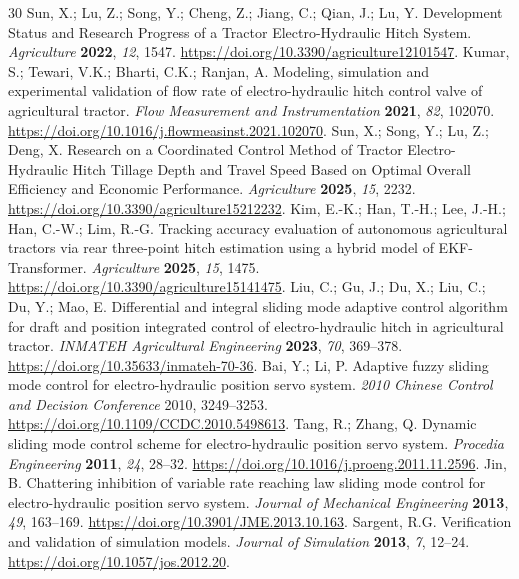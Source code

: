 \documentclass[machines,article,submit,pdftex,moreauthors]{Definitions/mdpi}
\begin{document}
\begin{thebibliography}{30}
 Sun, X.; Lu, Z.; Song, Y.; Cheng, Z.; Jiang, C.; Qian, J.; Lu, Y. Development Status and Research Progress of a Tractor Electro-Hydraulic Hitch System. \emph{Agriculture} \textbf{2022}, \emph{12}, 1547. \url{https://doi.org/10.3390/agriculture12101547}.
 Kumar, S.; Tewari, V.K.; Bharti, C.K.; Ranjan, A. Modeling, simulation and experimental validation of flow rate of electro-hydraulic hitch control valve of agricultural tractor. \emph{Flow Measurement and Instrumentation} \textbf{2021}, \emph{82}, 102070. \url{https://doi.org/10.1016/j.flowmeasinst.2021.102070}.
 Sun, X.; Song, Y.; Lu, Z.; Deng, X. Research on a Coordinated Control Method of Tractor Electro-Hydraulic Hitch Tillage Depth and Travel Speed Based on Optimal Overall Efficiency and Economic Performance. \emph{Agriculture} \textbf{2025}, \emph{15}, 2232. \url{https://doi.org/10.3390/agriculture15212232}.
 Kim, E.-K.; Han, T.-H.; Lee, J.-H.; Han, C.-W.; Lim, R.-G. Tracking accuracy evaluation of autonomous agricultural tractors via rear three-point hitch estimation using a hybrid model of EKF-Transformer. \emph{Agriculture} \textbf{2025}, \emph{15}, 1475. \url{https://doi.org/10.3390/agriculture15141475}.
 Liu, C.; Gu, J.; Du, X.; Liu, C.; Du, Y.; Mao, E. Differential and integral sliding mode adaptive control algorithm for draft and position integrated control of electro-hydraulic hitch in agricultural tractor. \emph{INMATEH Agricultural Engineering} \textbf{2023}, \emph{70}, 369--378. \url{https://doi.org/10.35633/inmateh-70-36}.
 Bai, Y.; Li, P. Adaptive fuzzy sliding mode control for electro-hydraulic position servo system. \emph{2010 Chinese Control and Decision Conference} 2010, 3249--3253. \url{https://doi.org/10.1109/CCDC.2010.5498613}.
 Tang, R.; Zhang, Q. Dynamic sliding mode control scheme for electro-hydraulic position servo system. \emph{Procedia Engineering} \textbf{2011}, \emph{24}, 28--32. \url{https://doi.org/10.1016/j.proeng.2011.11.2596}.
 Jin, B. Chattering inhibition of variable rate reaching law sliding mode control for electro-hydraulic position servo system. \emph{Journal of Mechanical Engineering} \textbf{2013}, \emph{49}, 163--169. \url{https://doi.org/10.3901/JME.2013.10.163}.
 Sargent, R.G. Verification and validation of simulation models. \emph{Journal of Simulation} \textbf{2013}, \emph{7}, 12--24. \url{https://doi.org/10.1057/jos.2012.20}.

\end{thebibliography}
\end{document}
